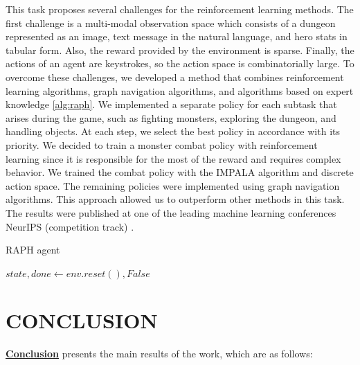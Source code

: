 This task proposes several challenges for the reinforcement learning methods. The first challenge is a multi-modal observation space which consists of a dungeon represented as an image, text message in the natural language, and hero stats in tabular form. Also, the reward provided by the environment is sparse. Finally, the actions of an agent are keystrokes, so the action space is combinatorially large. To overcome these challenges, we developed a method that combines reinforcement learning algorithms, graph navigation algorithms, and algorithms based on expert knowledge \ref{alg:raph}. We implemented a separate policy for each subtask that arises during the game, such as fighting monsters, exploring the dungeon, and handling objects. At each step, we select the best policy in accordance with its priority. We decided to train a monster combat policy with reinforcement learning since it is responsible for the most of the reward and requires complex behavior. We trained the combat policy with the IMPALA \cite{impala} algorithm and discrete action space. The remaining policies were implemented using graph navigation algorithms. This approach allowed us to outperform other methods in this task. The results were published at one of the leading machine learning conferences NeurIPS (competition track) \cite{confbib3}.

\begin{algorithm}[ht]
\caption{RAPH agent}\label{alg:raph}
$state, done \gets env.reset(), False$\;

\end{algorithm}


\FloatBarrier
\section*{\centering CONCLUSION}
\underline{\textbf{Conclusion}} presents the main results of the work, which are as follows:


